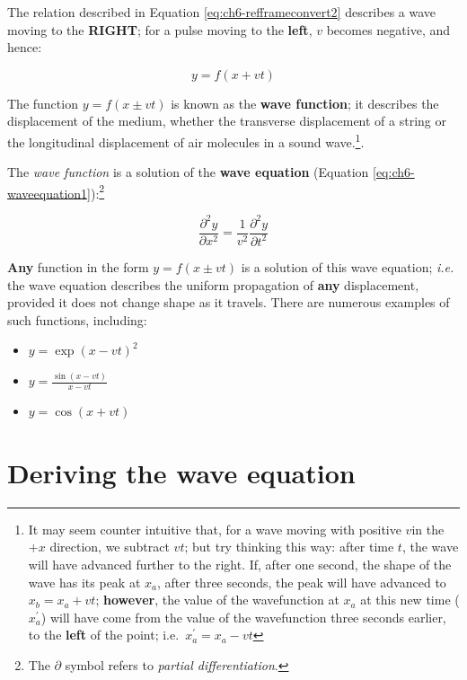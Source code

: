 \documentclass[
]{book}
\providecommand{\tightlist}{%
  \setlength{\itemsep}{0pt}\setlength{\parskip}{0pt}}
\begin{document}
The relation described in Equation \eqref{eq:ch6-refframeconvert2} describes a wave moving to the \textbf{RIGHT}; for a pulse moving to the \textbf{left}, \(v\) becomes negative, and hence:

\begin{equation}
y = f(x + vt)
\end{equation}

The function \(y = f(x \pm vt)\) is known as the \textbf{wave function}; it describes the displacement of the medium, whether the transverse displacement of a string or the longitudinal displacement of air molecules in a sound wave.\footnote{It may seem counter intuitive that, for a wave moving with positive \(v\)in the \(+x\) direction, we subtract \(vt\); but try thinking this way: after time \(t\), the wave will have advanced further to the right. If, after one second, the shape of the wave has its peak at \(x_a\), after three seconds, the peak will have advanced to \(x_b = x_a + vt\); \textbf{however}, the value of the wavefunction at \(x_a\) at this new time (\(x_a^\prime\)) will have come from the value of the wavefunction three seconds earlier, to the \textbf{left} of the point; i.e.~\(x_a^\prime = x_a - vt\)}.

The \emph{wave function} is a solution of the \textbf{wave equation} (Equation \eqref{eq:ch6-waveequation1}):\footnote{The \(\partial\) symbol refers to \emph{partial differentiation}.}

\begin{equation}
\frac{\partial^2 y}{\partial x^2} = \frac{1}{v^2} \frac{\partial^2 y}{\partial t^2}
\label{eq:ch6-waveequation1}
\end{equation}

\textbf{Any} function in the form \(y = f(x \pm vt)\) is a solution of this wave equation; \emph{i.e.} the wave equation describes the uniform propagation of \textbf{any} displacement, provided it does not change shape as it travels. There are numerous examples of such functions, including:

\begin{itemize}
\tightlist
\item
  \(y = \exp(x-vt)^2\)
\item
  \(y = \frac{\sin(x-vt)}{x-vt}\)
\item
  \(y = \cos (x+vt)\)
\end{itemize}

\hypertarget{sec-ch6-derivingwaveequation}{%
\section{Deriving the wave equation}\label{sec-ch6-derivingwaveequation}}
\end{document}
